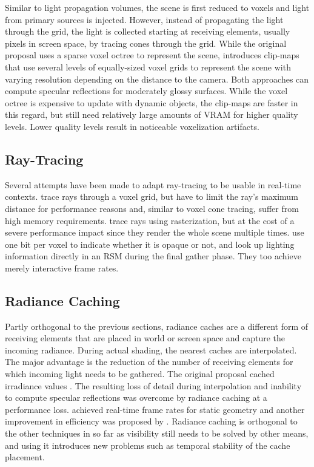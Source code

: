 Similar to light propagation volumes, the scene is first reduced to voxels and light from primary sources is injected. However, instead of propagating the light through the grid, the light is collected starting at receiving elements, usually pixels in screen space, by tracing cones through the grid.
While the original proposal \citep{Crassin:2012:OctreeVCT} uses a sparse voxel octree to represent the scene, \citet{Panteleev:2015:VXGI} introduces clip-maps that use several levels of equally-sized voxel grids to represent the scene with varying resolution depending on the distance to the camera.
Both approaches can compute specular reflections for moderately glossy surfaces. While the voxel octree is expensive to update with dynamic objects, the clip-maps are faster in this regard, but still need relatively large amounts of VRAM for higher quality levels. Lower quality levels result in noticeable voxelization artifacts.


\subsection{Ray-Tracing}

Several attempts have been made to adapt ray-tracing to be usable in real-time contexts.
\citet{Thiedemann:2011:VGI} trace rays through a voxel grid, but have to limit the ray's maximum distance for performance reasons and, similar to voxel cone tracing, suffer from high memory requirements.
\citet{Tokuyoshi:2012:pathtracingrasterization} trace rays using rasterization, but at the cost of a severe performance impact since they render the whole scene multiple times.
\citet{Chen:2016:Compactvoxels} use one bit per voxel to indicate whether it is opaque or not, and look up lighting information directly in an RSM during the final gather phase. They too achieve merely interactive frame rates.


\subsection{Radiance Caching}

Partly orthogonal to the previous sections, radiance caches are a different form of receiving elements that are placed in world or screen space and capture the incoming radiance. During actual shading, the nearest caches are interpolated. The major advantage is the reduction of the number of receiving elements for which incoming light needs to be gathered.
The original proposal cached irradiance values \citep{Ward:1988:IrradianceCaching}. The resulting loss of detail during interpolation and inability to compute specular reflections was overcome by radiance caching \citep{Krivanek:2005:RadianceCaching} at a performance loss. \citet{Scherzer:2012:PreconvolvedRadianceCaching} achieved real-time frame rates for static geometry and another improvement in efficiency was proposed by \citet{Rehfeld:2014:ClusteredPreconvolvedRadianceCaching}.
Radiance caching is orthogonal to the other techniques in so far as visibility still needs to be solved by other means, and using it introduces new problems such as temporal stability of the cache placement.


